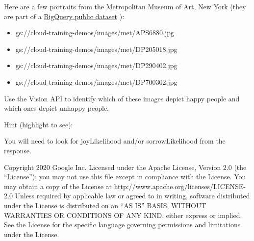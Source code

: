 \documentclass[11pt]{article}
\makeatletter
\providecommand{\tightlist}{%
      \setlength{\itemsep}{0pt}\setlength{\parskip}{0pt}}
\newcommand{\boxspacing}{\kern\kvtcb@left@rule\kern\kvtcb@boxsep}
\newcommand{\prompt}[4]{
        \ttfamily\llap{{\color{#2}[#3]:\hspace{3pt}#4}}\vspace{-\baselineskip}
    }
\makeatother
\begin{document}
Here are a few portraits from the Metropolitan Museum of Art, New York
(they are part of a
\href{https://bigquery.cloud.google.com/dataset/bigquery-public-data:the_met}{BigQuery
public dataset} ):

\begin{itemize}
\tightlist
\item
  gs://cloud-training-demos/images/met/APS6880.jpg
\item
  gs://cloud-training-demos/images/met/DP205018.jpg
\item
  gs://cloud-training-demos/images/met/DP290402.jpg
\item
  gs://cloud-training-demos/images/met/DP700302.jpg
\end{itemize}

Use the Vision API to identify which of these images depict happy people
and which ones depict unhappy people.

Hint (highlight to see):

You will need to look for joyLikelihood and/or sorrowLikelihood from the
response.

    Copyright 2020 Google Inc. Licensed under the Apache License, Version
2.0 (the ``License''); you may not use this file except in compliance
with the License. You may obtain a copy of the License at
http://www.apache.org/licenses/LICENSE-2.0 Unless required by applicable
law or agreed to in writing, software distributed under the License is
distributed on an ``AS IS'' BASIS, WITHOUT WARRANTIES OR CONDITIONS OF
ANY KIND, either express or implied. See the License for the specific
language governing permissions and limitations under the License.

    \begin{tcolorbox}[breakable, size=fbox, boxrule=1pt, pad at break*=1mm,colback=cellbackground, colframe=cellborder]
\prompt{In}{incolor}{ }{\boxspacing}
\begin{Verbatim}[commandchars=\\\{\}]

\end{Verbatim}
\end{tcolorbox}

    \begin{tcolorbox}[breakable, size=fbox, boxrule=1pt, pad at break*=1mm,colback=cellbackground, colframe=cellborder]
\prompt{In}{incolor}{ }{\boxspacing}
\begin{Verbatim}[commandchars=\\\{\}]

\end{Verbatim}
\end{tcolorbox}


    
    
    
\end{document}
